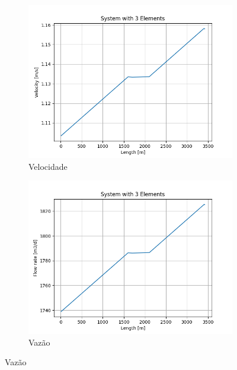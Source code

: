 \documentclass[final,3p]{elsarticle}
\numberwithin{equation}{section}
\begin{document}
        \begin{figure}
          \centering

          \begin{subfigure}{0.45\textwidth}
            \includegraphics[width=\textwidth]{flow/system1_v.png}
            \caption{Velocidade}
          \end{subfigure}
          \hfill
          \begin{subfigure}{0.45\textwidth}
            \includegraphics[width=\textwidth]{flow/system1_q.png}
            \caption{Vazão}
          \end{subfigure}


\end{figure}
\end{document}
